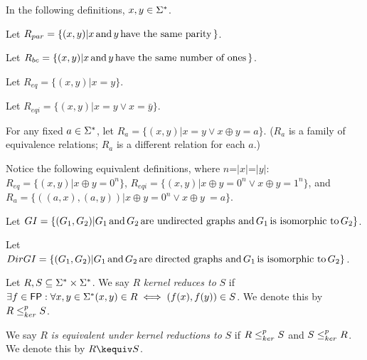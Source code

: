 In the following definitions, $x,y\in\Sigma^{*}$.

Let $R_{par}=\{(x, y)|x \,\text{and}\, y \,\text{have the same parity}\,\}$.

Let $R_{bc}=\{(x, y)|x \,\text{and}\, y \,\text{have the same number of ones}\,\}$.

Let $R_{eq}=\{(x, y)|x = y\}$.

Let $R_{eqi}=\{(x, y)|x = y \lor x = \bar{y}\}$.

For any fixed $a\in\Sigma^{*}$, let $R_{a}=\{(x, y)|x = y \lor x \oplus y =
a\}$. ($R_{a}$ is a family of equivalence relations; $R_{a}$ is a different
relation for each $a$.)

Notice the following equivalent definitions, where $n$=$|x|$=$|y|$:
$R_{eq}=\{(x, y)|x \oplus y = 0^n\}$, $R_{eqi}=\{(x, y)|x \oplus y = 0^n \lor x
\oplus y = 1^n\}$, and $R_{a}=\{((a,x),(a,y))|x \oplus y = 0^n \lor x \oplus
y\ = a\}$.

Let $GI=\{(G_1, G_2)|G_1 \,\text{and}\, G_2 \,\text{are undirected graphs and}\, G_1
\,\text{is isomorphic to}\, G_2\}$.

Let $DirGI=\{(G_1, G_2)| G_1 \,\text{and}\, G_2 \,\text{are directed graphs and}\,
G_1 \,\text{is isomorphic to}\, G_2\}$.

\begin{definition}\label{def:kr}
  Let $R,S\subseteq\Sigma^{*}\times\Sigma^{*}$. We say $R$ \textit{kernel
  reduces to} $S$ if $\exists f\in{\ensuremath{\mathsf{FP}}}:\forall x,y\in\Sigma^{*} (x, y)\in R \iff
  (f(x),f(y))\in S$. We denote this by $R\leq^{p}_{ker} S$.
  
  We say $R$ \textit{is equivalent under kernel reductions to} $S$ if $R\leq^{p}_{ker} S$
  and $S\leq^{p}_{ker} R$. We denote this by $R\kequiv S$.\end{definition}
